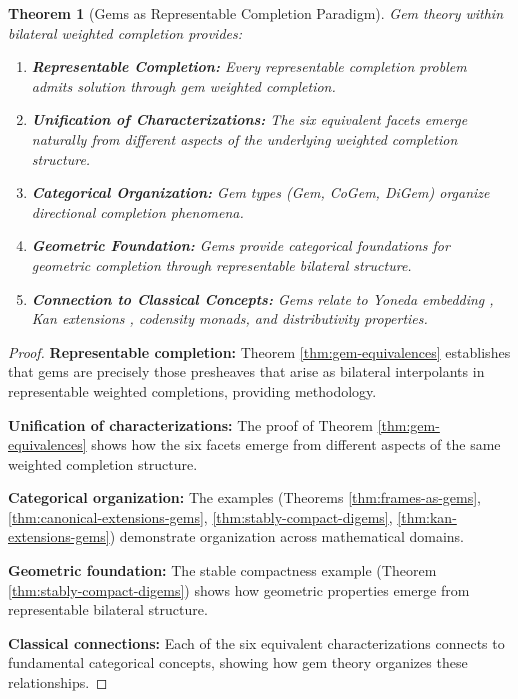 \documentclass[11pt]{article}
\theoremstyle{plain}
\newtheorem{theorem}{Theorem}[section]
\theoremstyle{definition}
\theoremstyle{remark}
\begin{document}
\begin{theorem}[Gems as Representable Completion Paradigm]\label{thm:gem-paradigm}
Gem theory within bilateral weighted completion provides:

\begin{enumerate}
\item \textbf{Representable Completion:} Every representable completion problem admits solution through gem weighted completion.

\item \textbf{Unification of Characterizations:} The six equivalent facets emerge naturally from different aspects of the underlying weighted completion structure.

\item \textbf{Categorical Organization:} Gem types (Gem, CoGem, DiGem) organize directional completion phenomena.

\item \textbf{Geometric Foundation:} Gems provide categorical foundations for geometric completion through representable bilateral structure.

\item \textbf{Connection to Classical Concepts:} Gems relate to Yoneda embedding \cite{yoneda1954homology}, Kan extensions \cite{kan1958adjoint}, codensity monads, and distributivity properties.
\end{enumerate}
\end{theorem}

\begin{proof}
\textbf{Representable completion:} Theorem \ref{thm:gem-equivalences} establishes that gems are precisely those presheaves that arise as bilateral interpolants in representable weighted completions, providing methodology.

\textbf{Unification of characterizations:} The proof of Theorem \ref{thm:gem-equivalences} shows how the six facets emerge from different aspects of the same weighted completion structure.

\textbf{Categorical organization:} The examples (Theorems \ref{thm:frames-as-gems}, \ref{thm:canonical-extensions-gems}, \ref{thm:stably-compact-digems}, \ref{thm:kan-extensions-gems}) demonstrate organization across mathematical domains.

\textbf{Geometric foundation:} The stable compactness example (Theorem \ref{thm:stably-compact-digems}) shows how geometric properties emerge from representable bilateral structure.

\textbf{Classical connections:} Each of the six equivalent characterizations connects to fundamental categorical concepts, showing how gem theory organizes these relationships.
\end{proof}
\end{document}
